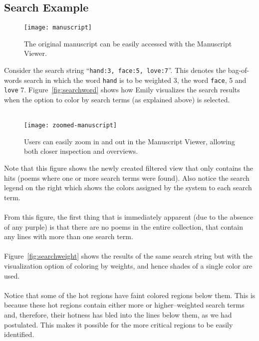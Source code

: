 \documentclass[10pt, twocolumn]{article}
\begin{document}
\subsection{Search Example}\label{sec:example}
\begin{figure}
\begin{center}
\texttt{[image: manuscript]} 
\end{center}
\caption{The original manuscript can be easily accessed with the Manuscript Viewer.} \label{fig:manuscript}
\end{figure}
Consider the search string ``\texttt{hand:3, face:5, love:7}''. This denotes the bag-of-words search in which the word \texttt{hand} is to be weighted 3, the word \texttt{face}, 5 and \texttt{love} 7. Figure~\ref{fig:searchword} shows how Emily visualizes the search results when the option to color by search terms (as explained above) is selected. \\ \\
\begin{figure}
\begin{center}
\texttt{[image: zoomed-manuscript]} 
\end{center}
\caption{Users can easily zoom in and out in the Manuscript Viewer, allowing both closer inspection and overviews.} \label{fig:zoomed-manuscript}
\end{figure}
Note that this figure shows the newly created filtered view that only contains the hits (poems where one or more search terms were found). Also notice the search legend on the right which shows the colors assigned by the system to each search term. \\ \\
From this figure, the first thing that is immediately apparent (due to the absence of any purple) is that there are no poems in the entire collection, that contain any lines with more than one search term. \\ \\
Figure~\ref{fig:searchweight} shows the results of the same search string but with the visualization option of coloring by weights, and hence shades of a single color are used. \\ \\ 
Notice that some of the hot regions have faint colored regions below them. This is because these hot regions contain either more or higher--weighted search terms and, therefore, their hotness has bled into the lines below them, as we had postulated. This makes it possible for the more critical regions to be easily identified. 
\end{document}
